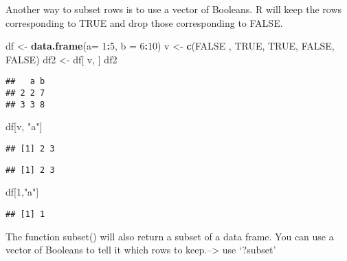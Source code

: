 \documentclass[
]{article}
\newenvironment{Shaded}{\begin{snugshade}}{\end{snugshade}}
\newcommand{\DataTypeTok}[1]{\textcolor[rgb]{0.13,0.29,0.53}{#1}}
\newcommand{\DecValTok}[1]{\textcolor[rgb]{0.00,0.00,0.81}{#1}}
\newcommand{\KeywordTok}[1]{\textcolor[rgb]{0.13,0.29,0.53}{\textbf{#1}}}
\newcommand{\NormalTok}[1]{#1}
\newcommand{\OperatorTok}[1]{\textcolor[rgb]{0.81,0.36,0.00}{\textbf{#1}}}
\newcommand{\OtherTok}[1]{\textcolor[rgb]{0.56,0.35,0.01}{#1}}
\newcommand{\StringTok}[1]{\textcolor[rgb]{0.31,0.60,0.02}{#1}}
\begin{document}
Another way to subset rows is to use a vector of Booleans. R will keep
the rows corresponding to TRUE and drop those corresponding to FALSE.

\begin{Shaded}
\begin{Highlighting}[]
\NormalTok{df <-}\StringTok{ }\KeywordTok{data.frame}\NormalTok{(}\DataTypeTok{a=} \DecValTok{1}\OperatorTok{:}\DecValTok{5}\NormalTok{, }\DataTypeTok{b =} \DecValTok{6}\OperatorTok{:}\DecValTok{10}\NormalTok{)}
\NormalTok{v <-}\StringTok{ }\KeywordTok{c}\NormalTok{(}\OtherTok{FALSE}\NormalTok{ , }\OtherTok{TRUE}\NormalTok{, }\OtherTok{TRUE}\NormalTok{, }\OtherTok{FALSE}\NormalTok{, }\OtherTok{FALSE}\NormalTok{) }
\NormalTok{df2 <-}\StringTok{ }\NormalTok{df[ v, ]}
\NormalTok{df2}
\end{Highlighting}
\end{Shaded}

\begin{verbatim}
##   a b
## 2 2 7
## 3 3 8
\end{verbatim}

\begin{Shaded}
\begin{Highlighting}[]
\NormalTok{df[v, }\StringTok{"a"}\NormalTok{]}
\end{Highlighting}
\end{Shaded}

\begin{verbatim}
## [1] 2 3
\end{verbatim}

\begin{Shaded}
\end{Shaded}

\begin{verbatim}
## [1] 2 3
\end{verbatim}

\begin{Shaded}
\begin{Highlighting}[]
\NormalTok{df[}\DecValTok{1}\NormalTok{,}\StringTok{"a"}\NormalTok{]}
\end{Highlighting}
\end{Shaded}

\begin{verbatim}
## [1] 1
\end{verbatim}

The function subset() will also return a subset of a data frame. You can
use a vector of Booleans to tell it which rows to keep.--\textgreater{}
use `?subset'
\end{document}
